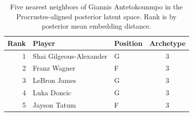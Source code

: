 \begin{table}[htbp]
  \centering\small
  \begin{tabular}{rllc}
    \toprule
    Rank & Player & Position & Archetype \\
    \midrule
    1 & Shai Gilgeous-Alexander & G & 3 \\
    2 & Franz Wagner & F & 3 \\
    3 & LeBron James & G & 3 \\
    4 & Luka Doncic & G & 3 \\
    5 & Jayson Tatum & F & 3 \\
    \bottomrule
  \end{tabular}
  \caption{Five nearest neighbors of Giannis Antetokounmpo in the Procrustes-aligned posterior latent space. Rank is by posterior mean embedding distance.}
  \label{tab:Giannis_Antetokounmpo_neighbors}
\end{table}

